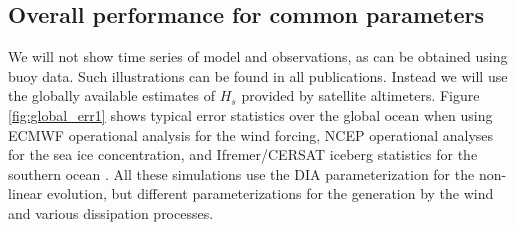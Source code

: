 \subsection{Overall performance for common parameters}
We will not show time series of model and observations, as can  be obtained using buoy data. Such illustrations 
can be found in all publications. Instead we will use the globally available estimates of $H_s$ provided by 
satellite altimeters. 
Figure \ref{fig:global_err1} shows typical error statistics over the global ocean when using ECMWF 
operational analysis for the wind forcing, NCEP operational analyses for the sea ice concentration, 
and Ifremer/CERSAT iceberg statistics for the southern ocean \citep{Tournadre&al.2012}. All these simulations use 
the DIA parameterization for the non-linear evolution, but different parameterizations for the generation by the wind 
and various dissipation processes. 

